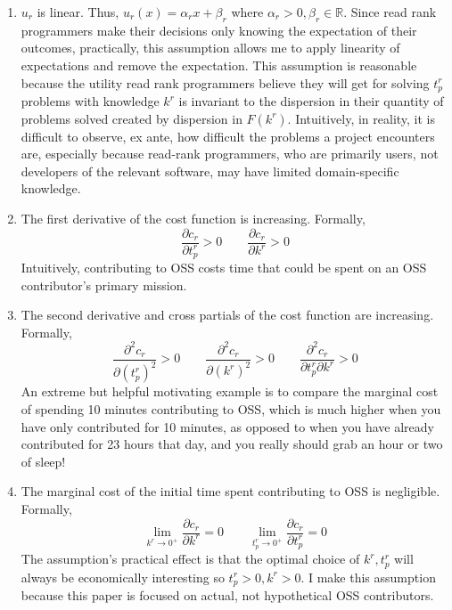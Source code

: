 \documentclass[source/paper/main.tex]{subfiles}
\begin{document}
\begin{enumerate}
    \item $u_r$ is linear. Thus, $u_r(x) = \alpha_r x + \beta_r$ where $\alpha_r > 0, \beta_r \in \mathbb{R}$. Since read rank programmers make their decisions only knowing the expectation of their outcomes, practically, this assumption allows me to apply linearity of expectations and remove the expectation. This assumption is reasonable because the utility read rank programmers believe they will get for solving $t_p^r$ problems with knowledge $k^r$ is invariant to the dispersion in their quantity of problems solved created by dispersion in $F(k^r)$. Intuitively, in reality, it is difficult to observe, ex ante, how difficult the problems a project encounters are, especially because read-rank programmers, who are primarily users, not developers of the relevant software, may have limited domain-specific knowledge. 
    
    \item The first derivative of the cost function is increasing. Formally, 
    $$\frac{\partial c_r}{\partial t_p^r}>0 \qquad \frac{\partial c_r}{\partial k^r}>0$$
    Intuitively, contributing to OSS costs time that could be spent on an OSS contributor's primary mission. 
    \item The second derivative and cross partials of the cost function are increasing. Formally, $$\frac{\partial^2 c_r}{\partial (t_p^r)^2}>0 \qquad \frac{\partial^2 c_r}{\partial (k^r)^2}>0 \qquad \frac{\partial^2 c_r}{\partial t_p^r \partial k^r}>0$$
    An extreme but helpful motivating example is to compare the marginal cost of spending 10 minutes contributing to OSS, which is much higher when you have only contributed for 10 minutes, as opposed to when you have already contributed for 23 hours that day, and you really should grab an hour or two of sleep! 
    \item The marginal cost of the initial time spent contributing to OSS is negligible. Formally, $$\lim_{k^r \to 0^+} \frac{\partial c_r}{\partial k^r} = 0 \qquad  \lim_{t_p^r \to 0^+} \frac{\partial c_r}{\partial t_p^r} = 0$$
    The assumption's practical effect is that the optimal choice of $k^r, t_p^r$ will always be economically interesting so $t_p^r>0, k^r>0$. I make this assumption because this paper is focused on actual, not hypothetical OSS contributors.
\end{enumerate}
\end{document}

